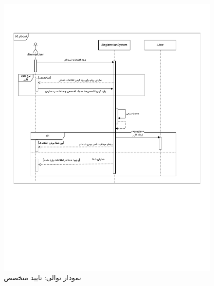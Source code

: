 \begin{figure}[ht!]
	\centering
	\includegraphics[scale=0.8, page=6]{figs/OOD-Sequence-1.pdf}
	\caption{نمودار توالی: تایید متخصص}
\end{figure}
\FloatBarrier
\newpage

